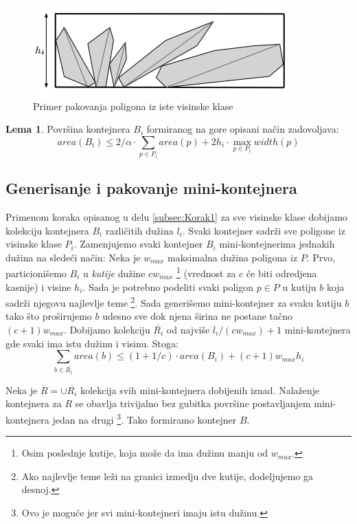 \documentclass[a4paper]{article}
\theoremstyle{plain}
\theoremstyle{definition}
\newtheorem{lem}[thm]{Lema} %
\begin{document}
\begin{figure}[H]
    \centering
    \includegraphics[scale=0.8]{resources/fig1.PNG}
    \caption{Primer pakovanja poligona iz iste visinske klase}
    \label{fig1}
\end{figure}

\begin{lem}
    Povr\v{s}ina kontejnera $B_{i}$ formiranog na gore opisani na\v{c}in zadovoljava: $$area(B_{i}) \leq 2/\alpha \cdot \sum_{p \in P_{i}}{area(p) + 2h_{i} \cdot \max_{p \in P_{i}}{width(p)}}$$
\end{lem}


\subsection{Generisanje i pakovanje mini-kontejnera}
\label{subsec:Korak2}

Primenom koraka opisanog u delu \ref{subsec:Korak1} za sve visinske klase dobijamo kolekciju kontejnera $B_{i}$ razli\v{c}itih du\v{z}ina $l_{i}$. Svaki kontejner sadr\v{z}i sve poligone iz visinske klase $P_{i}$. Zamenjujemo svaki kontejner $B_{i}$ mini-kontejnerima jednakih du\v{z}ina na slede\'c{}i na\v{c}in: Neka je $w_{max}$ maksimalna du\v{z}ina poligona iz $P$. Prvo, particioni\v{s}emo $B_{i}$ u \emph{kutije} du\v{z}ine $cw_{max}$ \footnote{Osim poslednje kutije, koja mo\v{z}e da ima du\v{z}inu manju od $w_{max}$.} (vrednost za $c$ \'c{}e biti odredjena kasnije) i visine $h_{i}$. Sada je potrebno podeliti svaki poligon $p \in P$ u kutiju $b$ koja sadr\v{z}i njegovu najlevlje teme \footnote{Ako najlevlje teme le\v{z}i na granici izmedju dve kutije, dodeljujemo ga desnoj.}. Sada generi\v{s}emo mini-kontejner za svaku kutiju $b$ tako \v{s}to pro\v{s}irujemo $b$ udesno sve dok njena \v{s}irina ne postane ta\v{c}no $(c+1)w_{max}$. Dobijamo kolekciju $\overline{R_{i}}$ od najvi\v{s}e $l_{i}/(cw_{max}) + 1$ mini-kontejnera gde svaki ima istu du\v{z}inu i visinu. Stoga:
$$\sum_{b \in \overline{R_{i}}}{area(b)} \leq (1 + 1/c) \cdot area(B_{i}) + (c+1)w_{max}h_{i}$$

Neka je $\overline{R} = \cup{\overline{R_{i}}}$ kolekcija svih mini-kontejnera dobijenih iznad. Nala\v{z}enje kontejnera za $R$ se obavlja trivijalno bez gubitka povr\v{s}ine postavljanjem mini-kontejnera jedan na drugi \footnote{Ovo je mogu\'c{}e jer svi mini-kontejneri imaju istu du\v{z}inu.}. Tako formiramo kontejner $B$.
\end{document}
